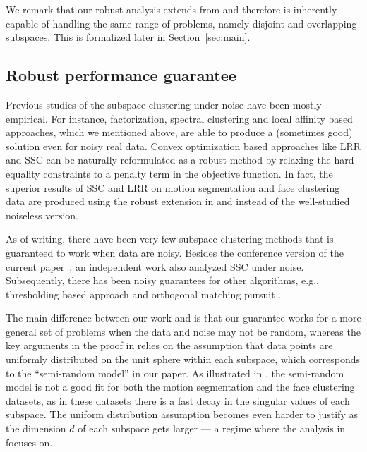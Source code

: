 \documentclass[twoside,11pt]{article}
\numberwithin{equation}{section}
\begin{document}
We remark that our robust analysis extends from \citet{soltanolkotabi2011geometric} and therefore is inherently capable of handling the same range of problems, namely disjoint and overlapping subspaces. This is formalized later in Section~\ref{sec:main}.

\subsection{Robust performance guarantee}

Previous studies of the subspace clustering under noise have been mostly empirical. For instance, factorization, spectral clustering and local affinity based approaches, which we mentioned above, are able to produce a (sometimes good) solution even for noisy real data. Convex optimization based approaches like LRR and SSC can be naturally reformulated as a robust method by relaxing the hard equality constraints to a penalty term in the objective function. In fact, the superior results of SSC and LRR on motion segmentation and face clustering data are produced using the robust extension in \citet{elhamifar2009ssc} and \citet{liu2010lrr_icml} instead of the well-studied noiseless version.

As of writing, there have been very few subspace clustering methods that is guaranteed to work when data are noisy.  Besides the conference version of the current paper~\citep{wang2013noisy}, an independent work \citep{soltanolkotabi2013robust} also analyzed SSC under noise. Subsequently, there has been noisy guarantees for other algorithms, e.g., thresholding based approach \citep{heckel2013noisy} and
orthogonal matching pursuit \citep{dyer2013greedy}.

The main difference between our work and \citep{soltanolkotabi2013robust} is that our guarantee works for a more general set of problems when the data and noise may not be random, whereas the key arguments in the proof in \citet{soltanolkotabi2013robust} relies on the assumption that data points are uniformly distributed on the unit sphere within each subspace, which corresponds to the ``semi-random model'' in our paper.
As illustrated in \citet[Figure~9~and~10]{elhamifar2012ssc_journal}, the semi-random model is not a good fit for both the motion segmentation and the face clustering datasets, as in these datasets there is a fast decay in the singular values of each subspace.  The uniform distribution assumption becomes even harder to justify as the dimension $d$ of each subspace gets larger --- a regime where the analysis in \citep{soltanolkotabi2013robust} focuses on.
\end{document}
